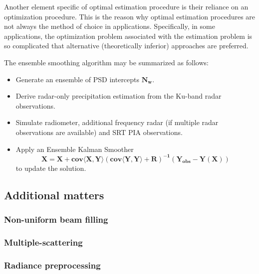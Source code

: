 \documentclass[10pt]{ietbook}
\begin{document}
Another element specific of optimal estimation procedure is their reliance on an optimization procedure. This is the reason why optimal estimation procedures
are not always the method of choice in applications.  Specifically, in some applications, the optimization problem  associated with the estimation problem is
so complicated that alternative (theoretically inferior) approaches are preferred.   

The ensemble smoothing algorithm may be summarized as follows:
\begin{itemize}
    \item Generate an ensemble of PSD intercepts $\mathbf{N_w}$.
    \item Derive radar-only precipitation estimation from the Ku-band radar observations.
    \item Simulate radiometer, additional frequency radar (if multiple radar observations are available) and SRT PIA observations.
    \item Apply an Ensemble Kalman Smoother
    \begin{equation}
        \mathbf{X=X+cov\langle X,Y \rangle (cov\langle Y,Y \rangle +R)^{-1} (Y_{obs}-Y(X))}
    \end{equation}
    to update the solution.
\end{itemize}

\subsection{Additional matters}
\subsubsection{Non-uniform beam filling}
\subsubsection{Multiple-scattering}
\subsubsection{Radiance preprocessing}
\end{document}

